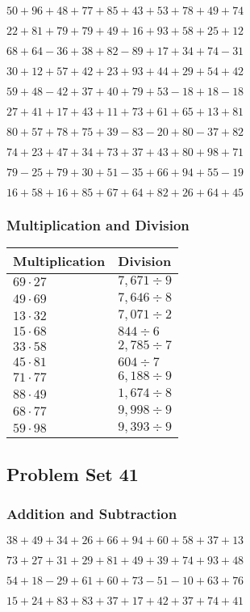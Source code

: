 \(50+96+48+77+85+43+53+78+49+ 74\)

\(22+81+79+79+49+16+93+58+25+12\)

\(68+64-36+38+82-89+17+34+74-31\)

\(30+12+57+42+23+93+44+29+54+42\)

\(59+48-42+37+40+79+53-18+18-18\)

\(27+41+17+43+11+73+61+65+13+81\)

\(80+57+78+75+39-83-20+80-37+82\)

\(74+23+47+34+73+37+43+80+98+71\)

\(79-25+79+30+51-35+66+94+55-19\)

\(16+58+16+85+67+64+82+26+64+45\)

\hypertarget{multiplication-and-division-80}{%
\subsubsection{Multiplication and
Division}\label{multiplication-and-division-80}}

\begin{longtable}[]{@{}ll@{}}
\toprule
Multiplication & Division\tabularnewline
\midrule
\endhead
\(69\cdot27\) & \(7,671÷9\)\tabularnewline
\(49\cdot69\) & \(7,646÷8\)\tabularnewline
\(13\cdot32\) & \(7,071÷2\)\tabularnewline
\(15\cdot68\) & \(844÷6\)\tabularnewline
\(33\cdot58\) & \(2,785÷7\)\tabularnewline
\(45\cdot81\) & \(604÷7\)\tabularnewline
\(71\cdot77\) & \(6,188÷9\)\tabularnewline
\(88\cdot49\) & \(1,674÷8\)\tabularnewline
\(68\cdot77\) & \(9,998÷9\)\tabularnewline
\(59\cdot98\) & \(9,393÷9\)\tabularnewline
\bottomrule
\end{longtable}

\hypertarget{problem-set-41-1}{%
\subsection{Problem Set 41}\label{problem-set-41-1}}

\hypertarget{addition-and-subtraction-81}{%
\subsubsection{Addition and
Subtraction}\label{addition-and-subtraction-81}}

\(38+49+34+26+66+94+60+58+37+ 13\)

\(73+27+31+29+81+49+39+74+93+48\)

\(54+18-29+61+60+73-51-10+63+76\)

\(15+24+83+83+37+17+42+37+74+41\)

